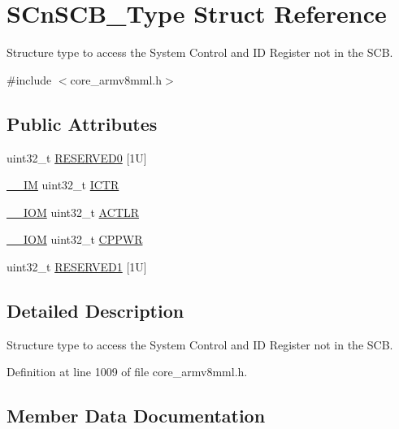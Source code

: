 \hypertarget{struct_s_cn_s_c_b___type}{}\section{S\+Cn\+S\+C\+B\+\_\+\+Type Struct Reference}
\label{struct_s_cn_s_c_b___type}


Structure type to access the System Control and ID Register not in the S\+CB.  




{\ttfamily \#include $<$core\+\_\+armv8mml.\+h$>$}

\subsection*{Public Attributes}
\begin{DoxyCompactItemize}
\item 
uint32\+\_\+t \hyperlink{struct_s_cn_s_c_b___type_a758b3cae751b227e20698256b6249dd4}{R\+E\+S\+E\+R\+V\+E\+D0} \mbox{[}1\+U\mbox{]}
\item 
\hyperlink{core__sc300_8h_a4cc1649793116d7c2d8afce7a4ffce43}{\+\_\+\+\_\+\+IM} uint32\+\_\+t \hyperlink{struct_s_cn_s_c_b___type_a34ec1d771245eb9bd0e3ec9336949762}{I\+C\+TR}
\item 
\hyperlink{core__sc300_8h_ab6caba5853a60a17e8e04499b52bf691}{\+\_\+\+\_\+\+I\+OM} uint32\+\_\+t \hyperlink{struct_s_cn_s_c_b___type_a13af9b718dde7481f1c0344f00593c23}{A\+C\+T\+LR}
\item 
\hyperlink{core__sc300_8h_ab6caba5853a60a17e8e04499b52bf691}{\+\_\+\+\_\+\+I\+OM} uint32\+\_\+t \hyperlink{struct_s_cn_s_c_b___type_a356efebfcbdaecaf1176e6cd86a60bf1}{C\+P\+P\+WR}
\item 
uint32\+\_\+t \hyperlink{struct_s_cn_s_c_b___type_a0bce3f86e9f6e00085cf5a126ae201c6}{R\+E\+S\+E\+R\+V\+E\+D1} \mbox{[}1\+U\mbox{]}
\end{DoxyCompactItemize}


\subsection{Detailed Description}
Structure type to access the System Control and ID Register not in the S\+CB. 

Definition at line 1009 of file core\+\_\+armv8mml.\+h.



\subsection{Member Data Documentation}
\mbox{\label{struct_s_cn_s_c_b___type_a13af9b718dde7481f1c0344f00593c23}} 
